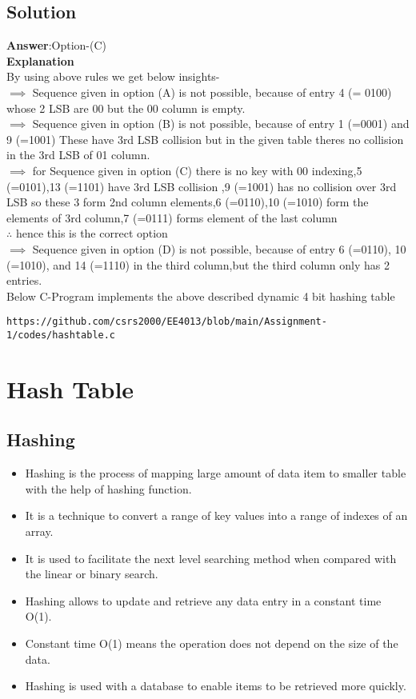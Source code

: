 \documentclass[journal,12pt,twocolumn]{IEEEtran}
\begin{document}
\subsection{Solution}
\textbf{Answer}:Option-(C)
\\
\textbf{Explanation}\\
By using above rules we get below insights-\\
$\implies$ Sequence given in option (A) is not possible, because of entry 4 (= 0100) whose 2 LSB are 00 but the 00 column is empty.\\
$\implies$ Sequence given in option (B) is not possible, because of entry 1 (=0001) and 9 (=1001) These have 3rd LSB collision but in the given table theres no collision in the 3rd LSB of 01 column.\\
$\implies$ for Sequence given in option (C) there is no key with 00 indexing,5 (=0101),13 (=1101) have 3rd LSB collision ,9 (=1001) has no collision over 3rd LSB so these 3 form 2nd column elements,6 (=0110),10 (=1010) form the elements of 3rd column,7 (=0111) forms element of the last column\\ $\therefore$ hence this is the correct option\\
$\implies$ Sequence given in option (D) is not possible, because of entry 6 (=0110), 10 (=1010), and 14 (=1110) in the third column,but the third column only has 2 entries.\\
Below C-Program implements the above described dynamic 4 bit hashing table
\begin{lstlisting}
https://github.com/csrs2000/EE4013/blob/main/Assignment-1/codes/hashtable.c
\end{lstlisting}
\section{\textbf{Hash Table}}
\subsection{\textbf{Hashing}}
\begin{itemize}
\item Hashing is the process of mapping large amount of data item to smaller table with the help of hashing function.
\item It is a technique to convert a range of key values into a range of indexes of an array.
\item It is used to facilitate the next level searching method when compared with the linear or binary search.
\item Hashing allows to update and retrieve any data entry in a constant time O(1).
\item Constant time O(1) means the operation does not depend on the size of the data.
\item Hashing is used with a database to enable items to be retrieved more quickly.
\end{itemize}
\end{document}
